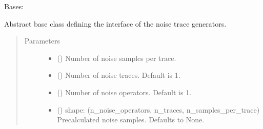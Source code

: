 \documentclass[letterpaper,10pt,english]{sphinxmanual}
\begin{document}
\begin{fulllineitems}
\label{\detokenize{qsim:qsim.noise.NoiseTraceGenerator}}
Bases: 

Abstract base class defining the interface of the noise trace generators.
\begin{quote}\begin{description}
\item[{Parameters}] \leavevmode\begin{itemize}
\item {} 
 () \textendash{} Number of noise samples per trace.

\item {} 
 (\sphinxstyleliteralemphasis{\sphinxupquote{, }}) \textendash{} Number of noise traces. Default is 1.

\item {} 
 (\sphinxstyleliteralemphasis{\sphinxupquote{, }}) \textendash{} Number of noise operators. Default is 1.

\item {} 
 (\sphinxstyleliteralemphasis{\sphinxupquote{, }}) \textendash{} shape: (n\_noise\_operators, n\_traces, n\_samples\_per\_trace)
Precalculated noise samples. Defaults to None.


\end{itemize}
\end{description}
\end{quote}
\end{fulllineitems}
\end{document}
